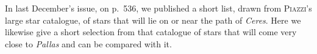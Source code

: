 In last December’s issue, on p.\ 536, we published a short list, drawn from \textsc{Piazzi}’s large star catalogue, of stars that will lie on or near the path of \emph{Ceres}. Here we likewise give a short selection from that catalogue of stars that will come very close to \emph{Pallas} and can be compared with it.

\begin{flushright}
\end{flushright}

\bigskip
